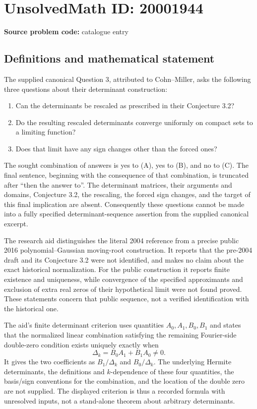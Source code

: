 \documentclass[11pt]{article}
\begin{document}
\section*{UnsolvedMath ID: 20001944}
\textbf{Source problem code:} catalogue entry
\subsection{Definitions and mathematical statement}
The supplied canonical Question 3, attributed to Cohn--Miller, asks the following three questions about their determinant construction:
\begin{enumerate}
\item[(A)] Can the determinants be rescaled as prescribed in their Conjecture 3.2?
\item[(B)] Do the resulting rescaled determinants converge uniformly on compact sets to a limiting function?
\item[(C)] Does that limit have any sign changes other than the forced ones?
\end{enumerate}
The sought combination of answers is yes to (A), yes to (B), and no to (C). The final sentence, beginning with the consequence of that combination, is truncated after ``then the answer to''. The determinant matrices, their arguments and domains, Conjecture 3.2, the rescaling, the forced sign changes, and the target of this final implication are absent. Consequently these questions cannot be made into a fully specified determinant-sequence assertion from the supplied canonical excerpt.

The research aid distinguishes the literal 2004 reference from a precise public 2016 polynomial--Gaussian moving-root construction. It reports that the pre-2004 draft and its Conjecture 3.2 were not identified, and makes no claim about the exact historical normalization. For the public construction it reports finite existence and uniqueness, while convergence of the specified approximants and exclusion of extra real zeros of their hypothetical limit were not found proved. These statements concern that public sequence, not a verified identification with the historical one.

The aid's finite determinant criterion uses quantities \(A_0,A_1,B_0,B_1\) and states that the normalized linear combination satisfying the remaining Fourier-side double-zero condition exists uniquely exactly when
\[
 \Delta_k=B_0A_1+B_1A_0\ne0.
\]
It gives the two coefficients as \(B_1/\Delta_k\) and \(B_0/\Delta_k\). The underlying Hermite determinants, the definitions and \(k\)-dependence of these four quantities, the basis/sign conventions for the combination, and the location of the double zero are not supplied. The displayed criterion is thus a recorded formula with unresolved inputs, not a stand-alone theorem about arbitrary determinants.
\end{document}
